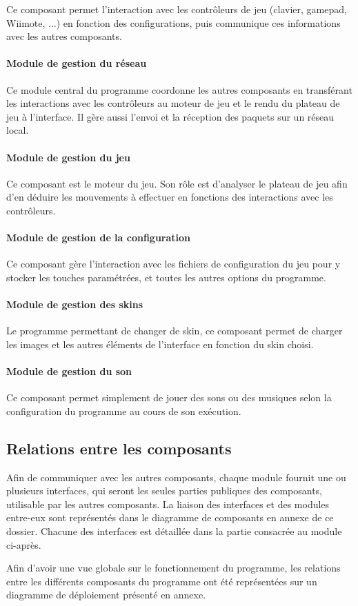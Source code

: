 Ce composant permet l'interaction avec les contrôleurs de jeu (clavier, gamepad, Wiimote, ...) en fonction des configurations, puis communique ces informations avec les autres composants.

\paragraph{Module de gestion du réseau}

Ce module central du programme coordonne les autres composants en transférant les interactions avec les contrôleurs au moteur de jeu et le rendu du plateau de jeu à l'interface. Il gère aussi l'envoi et la réception des paquets sur un réseau local.

\paragraph{Module de gestion du jeu}

Ce composant est le moteur du jeu. Son rôle est d'analyser le plateau de jeu afin d'en déduire les mouvements à effectuer en fonctions des interactions avec les contrôleurs.

\paragraph{Module de gestion de la configuration}

Ce composant gère l'interaction avec les fichiers de configuration du jeu pour y stocker les touches paramétrées, et toutes les autres options du programme.

\paragraph{Module de gestion des skins}

Le programme permettant de changer de skin, ce composant permet de charger les images et les autres éléments de l'interface en fonction du skin choisi.

\paragraph{Module de gestion du son}

Ce composant permet simplement de jouer des sons ou des musiques selon la configuration du programme au cours de son exécution.

\subsection{Relations entre les composants}

Afin de communiquer avec les autres composants, chaque module fournit une ou plusieurs interfaces, qui seront les seules parties publiques des composants, utilisable par les autres composants. La liaison des interfaces et des modules entre-eux sont représentés dans le diagramme de composants en annexe de ce dossier. Chacune des interfaces est détaillée dans la partie consacrée au module ci-après.

Afin d'avoir une vue globale sur le fonctionnement du programme, les relations entre les différents composants du programme ont été représentées sur un diagramme de déploiement présenté en annexe.